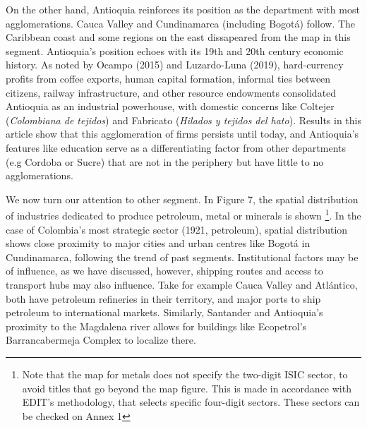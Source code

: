 \documentclass[12pt,a4paper]{article}
\begin{document}
On the other hand, Antioquia reinforces its position as the department with most agglomerations. Cauca Valley and Cundinamarca (including Bogotá) follow. The Caribbean coast and some regions on the east dissapeared from the map in this segment. Antioquia's position echoes with its 19th and 20th century economic history. As noted by Ocampo (2015) and Luzardo-Luna (2019), hard-currency profits from coffee exports, human capital formation, informal ties between citizens, railway infrastructure, and other resource endowments consolidated Antioquia as an industrial powerhouse, with domestic concerns like Coltejer (\textit{Colombiana de tejidos}) and Fabricato (\textit{Hilados y tejidos del hato}). Results in this article show that this agglomeration of firms persists until today, and Antioquia's features like education serve as a differentiating factor from other departments (e.g Cordoba or Sucre) that are not in the periphery but have little to no agglomerations. \newpage

We now turn our attention to other segment. In Figure 7, the spatial distribution of industries dedicated to produce petroleum, metal or minerals is shown \footnote{Note that the map for metals does not specify the two-digit ISIC sector, to avoid titles that go beyond the map figure. This is made in accordance with EDIT's methodology, that selects specific four-digit sectors. These sectors can be checked on Annex 1}. In the case of Colombia's most strategic sector (1921, petroleum), spatial distribution shows close proximity to major cities and urban centres like Bogotá in Cundinamarca, following the trend of past segments. Institutional factors may be of influence, as we have discussed, however, shipping routes and access to transport hubs may also influence. Take for example Cauca Valley and Atlántico, both have petroleum refineries in their territory, and major ports to ship petroleum to international markets. Similarly, Santander and Antioquia's proximity to the Magdalena river allows for buildings like Ecopetrol's Barrancabermeja Complex to localize there.
\end{document}
